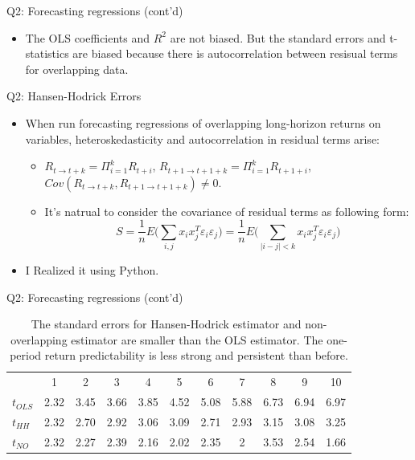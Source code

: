 \documentclass[10pt,t]{beamer}
\begin{document}
\begin{frame}{Q2: Forecasting regressions (cont'd)}
\begin{itemize}
  \item The OLS coefficients and $R^2$ are not biased. But the standard errors and t-statistics are biased because there is autocorrelation between resisual terms for overlapping data.
\end{itemize}
\end{frame}


\begin{frame}{Q2: Hansen-Hodrick Errors}
\begin{itemize}
  \item When run forecasting regressions of overlapping long-horizon returns on variables, heteroskedasticity and autocorrelation in residual terms arise:
  \begin{itemize}
    \item $R_{t\rightarrow t+k} =\Pi_{i = 1}^{k} R_{t+i}$, $R_{t + 1\rightarrow t+1+k} =\Pi_{i = 1}^{k} R_{t+1+i}$, $Cov(R_{t\rightarrow t+k}, R_{t + 1\rightarrow t+1+k}) \neq 0$.
    \item It's natrual to consider the covariance of residual terms as following form:
    $$
    S = \frac{1}{n}E\bigg(\sum_{i,j} x_i x_j^T \varepsilon_i \varepsilon_j\bigg)
    = \frac{1}{n}E\bigg(\sum_{\vert i-j\vert < k} x_i x_j^T \varepsilon_i \varepsilon_j\bigg)
    $$
  \end{itemize}
  \item I Realized it using Python.
\end{itemize}
\end{frame}


\begin{frame}{Q2: Forecasting regressions (cont'd)}
\begin{table}
\begin{tabular}{lcccccccccc}
\toprule
& 1 & 2 & 3 & 4 & 5 & 6 & 7 & 8 & 9 & 10\\
\cmidrule{1-11}
$t_{OLS}$ & 2.32 & 3.45 & 3.66 & 3.85 & 4.52 & 5.08 & 5.88 & 6.73 & 6.94 & 6.97 \\
$t_{HH}$ & 2.32 & 2.70 & 2.92& 3.06 & 3.09 & 2.71& 2.93 & 3.15 & 3.08& 3.25 \\
$t_{NO}$ & 2.32 & 2.27 & 2.39 & 2.16 & 2.02 & 2.35 & 2 & 3.53& 2.54 & 1.66\\
\bottomrule
\end{tabular}
\caption{The standard errors for Hansen-Hodrick estimator and non-overlapping estimator are smaller than the OLS estimator. The one-period return predictability is less strong and persistent than before.}
\end{table}
\end{frame}
\end{document}
